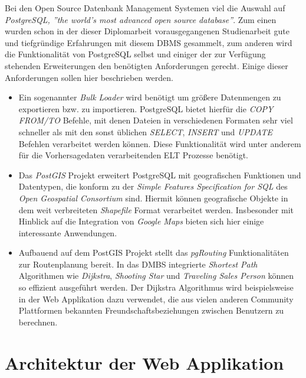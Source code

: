 Bei den Open Source Datenbank Management Systemen viel die Auswahl auf
\textit{PostgreSQL, ''the world's most advanced open source
  database''}. Zum einen wurden schon in der dieser Diplomarbeit
vorausgegangenen Studienarbeit gute und tiefgründige Erfahrungen mit
diesem DBMS gesammelt, zum anderen wird die Funktionalität von
PostgreSQL selbst und einiger der zur Verfügung stehenden
Erweiterungen den benötigten Anforderungen gerecht. Einige dieser
Anforderungen sollen hier beschrieben werden.

\begin{itemize}
\item Ein sogenannter \textit{Bulk Loader} wird benötigt um größere
  Datenmengen zu exportieren bzw. zu importieren. PostgreSQL bietet
  hierfür die \textit{COPY FROM/TO} Befehle, mit denen Dateien in
  verschiedenen Formaten sehr viel schneller als mit den sonst
  üblichen \textit{SELECT}, \textit{INSERT} und \textit{UPDATE}
  Befehlen verarbeitet werden können. Diese Funktionalität wird unter
  anderem für die Vorhersagedaten verarbeitenden ELT Prozesse
  benötigt.

\item Das \textit{PostGIS} Projekt erweitert PostgreSQL mit
  geografischen Funktionen und Datentypen, die konform zu der
  \textit{Simple Features Specification for SQL} des \textit{Open
    Geospatial Consortium} sind. Hiermit können geografische Objekte
  in dem weit verbreiteten \textit{Shapefile} Format verarbeitet
  werden. Insbesonder mit Hinblick auf die Integration von
  \textit{Google Maps} bieten sich hier einige interessante
  Anwendungen.

\item Aufbauend auf dem PostGIS Projekt stellt das \textit{pgRouting}
  Funktionalitäten zur Routenplanung bereit. In das DMBS integrierte
  \textit{Shortest Path} Algorithmen wie \textit{Dijkstra},
  \textit{Shooting Star} und \textit{Traveling Sales Person} können so
  effizient ausgeführt werden. Der Dijkstra Algorithmus wird
  beispielsweise in der Web Applikation dazu verwendet, die aus vielen
  anderen Community Plattformen bekannten Freundschaftsbeziehungen
  zwischen Benutzern zu berechnen.

\end{itemize}

\section{Architektur der Web Applikation}

